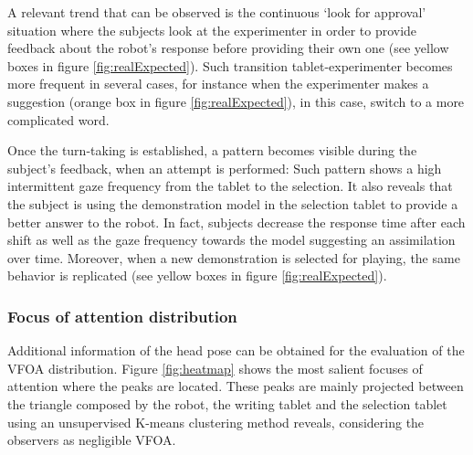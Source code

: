\documentclass{sig-alternate}
\begin{document}
A relevant trend that can be observed is the continuous `look for approval'
situation where the subjects look at the experimenter in order to provide
feedback about the robot's response before providing their own one (see yellow
boxes in figure \ref{fig:realExpected}). Such transition tablet-experimenter
becomes more frequent in several cases, for instance when the experimenter makes
a suggestion (orange box in figure \ref{fig:realExpected}), in this case, switch
to a more complicated word.

Once the turn-taking is established, a pattern becomes visible during the
subject's feedback, when an attempt is performed: Such pattern shows a high
intermittent gaze frequency from the tablet to the selection. It also reveals
that the subject is using the demonstration model in the selection tablet to
provide a better answer to the robot. In fact, subjects decrease the response
time after each shift as well as the gaze frequency towards the model suggesting
an assimilation over time. Moreover, when a new demonstration is selected for
playing, the same behavior is replicated (see yellow boxes in figure
\ref{fig:realExpected}).

\subsubsection{Focus of attention distribution}

Additional information of the head pose can be obtained for the evaluation of
the VFOA distribution. Figure \ref{fig:heatmap} shows the most salient focuses
of attention where the peaks are located. These peaks are mainly projected
between the triangle composed by the robot, the writing tablet and the selection
tablet using an unsupervised K-means clustering method reveals, considering the
observers as negligible VFOA.
\end{document}

